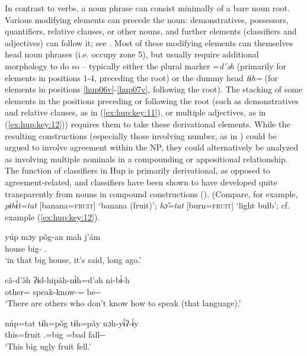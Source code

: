 \documentclass[output=paper]{langscibook}
\begin{document}
In contrast to verbs, a noun phrase can consist minimally of a bare noun root. Various modifying elements can precede the noun: demonstratives, possessors, quantifiers, relative clauses, or other nouns, and further elements (classifiers and adjectives) can follow it; see  . Most of these modifying elements can themselves head noun phrases (i.e. occupy zone 5), but usually require additional morphology to do so – typically either the plural marker =\textit{d'ǝh} (primarily for elements in positions 1-4, preceding the root) or the dummy head \textit{tɨh=} (for elements in positions \ref{hup06v}-\ref{hup07v}, following the root). The stacking of some elements in the positions preceding or following the root (such as demonstratives and relative clauses, as in  (\ref{ex:hup:key:11}), or multiple adjectives, as in (\ref{ex:hup:key:12})) requires them to take these derivational elements. While the resulting constructions (especially those involving number, as in ) could be argued to involve agreement within the NP, they could alternatively be analyzed as involving multiple nominals in a compounding or appositional relationship. The function of classifiers in Hup is primarily derivational, as opposed to agreement-related, and classifiers have been shown to have developed quite transparently from nouns in compound constructions (\citealt{Epps2007,Epps2008}). (Compare, for example, \textit{pɨhɨ́t=tat} [banana=\textsc{fruit}] `banana (fruit)'; \textit{hɔ̃=tat} [burn=\textsc{fruit}] `light bulb'; cf. example (\ref{ex:hup:key:12}).

\ea\label{ex:hup:key:10}
\gll yúp mɔy pǒg-an mah j'ám\\ 
\Dem{} house big-\Dir{} \Rep{} \Dst.\Pst{} \\ 
\glt `in that big house, it's said, long ago.'
\z 

\ea\label{ex:hup:key:11}
\gll cã-d'ǝ̌h ʔɨd-hipãh-nɨ́h=d'ǝh ni-bɨ́-h\\ 
 other=\Pl{} speak-know-\Neg{}=\Pl{} be-\Hab{}-\Decl{}\\ 
\glt `There are others who don't know how to speak (that language).'
\z 

\ea\label{ex:hup:key:12}
\gll núp=tat tɨh=pǒg tɨh=pǎy nɔh-yɨ́ʔ-ɨ́y\\ 
this=fruit \Third.\SG{}=big \Third\Sg{}=bad fall-\Tel{}-\Dynm{}\\ 
\glt `This big ugly fruit fell.'\protect\footnotemark
\z 

\end{document}
